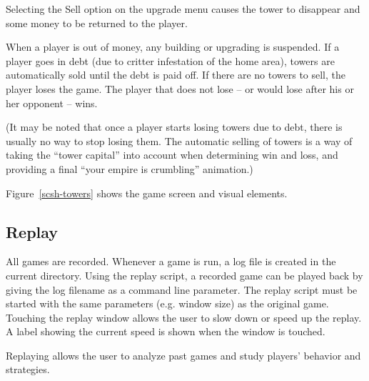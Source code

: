 \documentclass[a4paper,11pt]{article}
\begin{document}
Selecting the Sell option on the upgrade menu causes the tower to disappear
and some money to be returned to the player.

When a player is out of money, any building or upgrading is suspended.
If a player goes in debt (due to critter infestation of the home area), towers
are automatically sold until the debt is paid off.
If there are no towers to sell, the player loses the game.
The player that does not lose – or would lose after his or her opponent – wins.

(It may be noted that once a player starts losing towers due to debt, there is
usually no way to stop losing them.
The automatic selling of towers is a way of taking the “tower capital” into
account when determining win and loss, and providing a final “your empire is
crumbling” animation.)

Figure~\ref{scsh-towers} shows the game screen and visual elements.

\subsection{Replay}

All games are recorded. Whenever a game is run, a log file is created in the
current directory.
Using the replay script, a recorded game can be played back by giving the log
filename as a command line parameter.
The replay script must be started with the same parameters (e.g. window
size) as the original game.
Touching the replay window allows the user to slow down or speed up the replay.
A label showing the current speed is shown when the window is touched.

Replaying allows the user to analyze past games and study players' behavior and
strategies.
\end{document}
